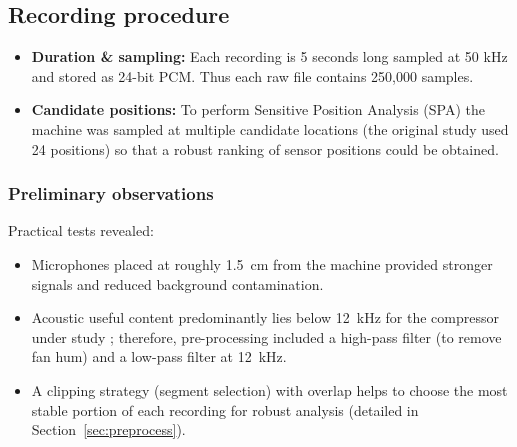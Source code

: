 \documentclass[12pt,a4paper]{article}
\begin{document}
\begin{multicols}{2}
\subsection{Recording procedure}
\begin{itemize}
  \item \textbf{Duration \& sampling:} Each recording is 5 seconds long sampled at 50 kHz and stored as 24-bit PCM. Thus each raw file contains 250,000 samples.
  \item \textbf{Candidate positions:} To perform Sensitive Position Analysis (SPA) the machine was sampled at multiple candidate locations (the original study used 24 positions) so that a robust ranking of sensor positions could be obtained.
\end{itemize}
\subsubsection{Preliminary observations}
Practical tests revealed:
\begin{itemize}
    \item Microphones placed at roughly \SI{1.5}{cm} from the machine provided stronger signals and reduced background contamination.
    \item Acoustic useful content predominantly lies below \SI{12}{kHz} for the compressor under study \cite{Verma2016}; therefore, pre-processing included a high-pass filter (to remove fan hum) and a low-pass filter at \SI{12}{kHz}.
    \item A clipping strategy (segment selection) with overlap helps to choose the most stable portion of each recording for robust analysis (detailed in Section~\ref{sec:preprocess}).
\end{itemize}

\end{multicols}
\end{document}
